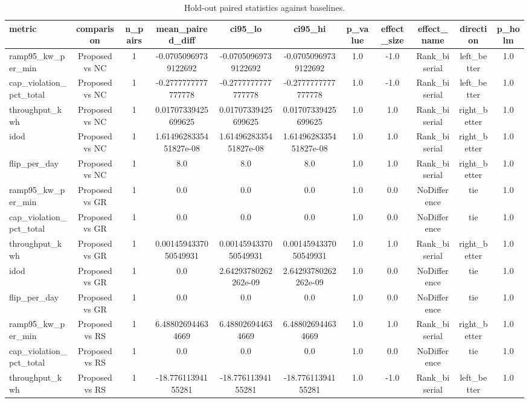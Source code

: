 \begin{table}[t]
\centering
\caption{Hold-out paired statistics against baselines.}
\label{tab:holdout_stats_auto}
\begin{tabular}{lcccccccccc}
\toprule
metric & comparison & n\_pairs & mean\_paired\_diff & ci95\_lo & ci95\_hi & p\_value & effect\_size & effect\_name & direction & p\_holm \\
\midrule
ramp95\_kw\_per\_min & Proposed vs NC & 1 & -0.07050969739122692 & -0.07050969739122692 & -0.07050969739122692 & 1.0 & -1.0 & Rank\_biserial & left\_better & 1.0 \\
cap\_violation\_pct\_total & Proposed vs NC & 1 & -0.2777777777777778 & -0.2777777777777778 & -0.2777777777777778 & 1.0 & -1.0 & Rank\_biserial & left\_better & 1.0 \\
throughput\_kwh & Proposed vs NC & 1 & 0.01707339425699625 & 0.01707339425699625 & 0.01707339425699625 & 1.0 & 1.0 & Rank\_biserial & right\_better & 1.0 \\
idod & Proposed vs NC & 1 & 1.6149628335451827e-08 & 1.6149628335451827e-08 & 1.6149628335451827e-08 & 1.0 & 1.0 & Rank\_biserial & right\_better & 1.0 \\
flip\_per\_day & Proposed vs NC & 1 & 8.0 & 8.0 & 8.0 & 1.0 & 1.0 & Rank\_biserial & right\_better & 1.0 \\
ramp95\_kw\_per\_min & Proposed vs GR & 1 & 0.0 & 0.0 & 0.0 & 1.0 & 0.0 & NoDifference & tie & 1.0 \\
cap\_violation\_pct\_total & Proposed vs GR & 1 & 0.0 & 0.0 & 0.0 & 1.0 & 0.0 & NoDifference & tie & 1.0 \\
throughput\_kwh & Proposed vs GR & 1 & 0.0014594337050549931 & 0.0014594337050549931 & 0.0014594337050549931 & 1.0 & 1.0 & Rank\_biserial & right\_better & 1.0 \\
idod & Proposed vs GR & 1 & 0.0 & 2.64293780262262e-09 & 2.64293780262262e-09 & 1.0 & 0.0 & NoDifference & tie & 1.0 \\
flip\_per\_day & Proposed vs GR & 1 & 0.0 & 0.0 & 0.0 & 1.0 & 0.0 & NoDifference & tie & 1.0 \\
ramp95\_kw\_per\_min & Proposed vs RS & 1 & 6.488026944634669 & 6.488026944634669 & 6.488026944634669 & 1.0 & 1.0 & Rank\_biserial & right\_better & 1.0 \\
cap\_violation\_pct\_total & Proposed vs RS & 1 & 0.0 & 0.0 & 0.0 & 1.0 & 0.0 & NoDifference & tie & 1.0 \\
throughput\_kwh & Proposed vs RS & 1 & -18.77611394155281 & -18.77611394155281 & -18.77611394155281 & 1.0 & -1.0 & Rank\_biserial & left\_better & 1.0 \\

\end{tabular}
\end{table}
